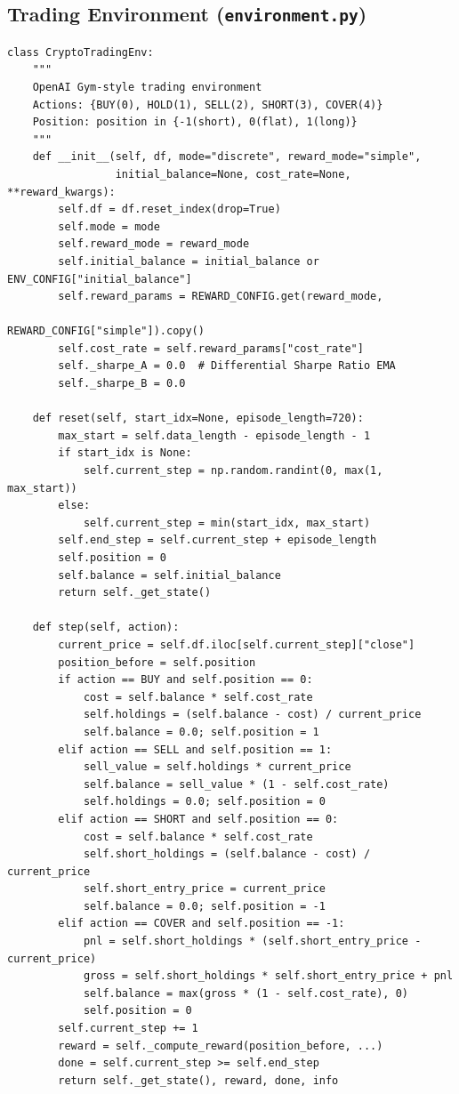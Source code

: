 \documentclass[11pt,a4paper]{article}
\begin{document}
\subsection{Trading Environment (\texttt{environment.py})}

\begin{lstlisting}
class CryptoTradingEnv:
    """
    OpenAI Gym-style trading environment
    Actions: {BUY(0), HOLD(1), SELL(2), SHORT(3), COVER(4)}
    Position: position in {-1(short), 0(flat), 1(long)}
    """
    def __init__(self, df, mode="discrete", reward_mode="simple",
                 initial_balance=None, cost_rate=None, **reward_kwargs):
        self.df = df.reset_index(drop=True)
        self.mode = mode
        self.reward_mode = reward_mode
        self.initial_balance = initial_balance or ENV_CONFIG["initial_balance"]
        self.reward_params = REWARD_CONFIG.get(reward_mode,
                                               REWARD_CONFIG["simple"]).copy()
        self.cost_rate = self.reward_params["cost_rate"]
        self._sharpe_A = 0.0  # Differential Sharpe Ratio EMA
        self._sharpe_B = 0.0

    def reset(self, start_idx=None, episode_length=720):
        max_start = self.data_length - episode_length - 1
        if start_idx is None:
            self.current_step = np.random.randint(0, max(1, max_start))
        else:
            self.current_step = min(start_idx, max_start)
        self.end_step = self.current_step + episode_length
        self.position = 0
        self.balance = self.initial_balance
        return self._get_state()

    def step(self, action):
        current_price = self.df.iloc[self.current_step]["close"]
        position_before = self.position
        if action == BUY and self.position == 0:
            cost = self.balance * self.cost_rate
            self.holdings = (self.balance - cost) / current_price
            self.balance = 0.0; self.position = 1
        elif action == SELL and self.position == 1:
            sell_value = self.holdings * current_price
            self.balance = sell_value * (1 - self.cost_rate)
            self.holdings = 0.0; self.position = 0
        elif action == SHORT and self.position == 0:
            cost = self.balance * self.cost_rate
            self.short_holdings = (self.balance - cost) / current_price
            self.short_entry_price = current_price
            self.balance = 0.0; self.position = -1
        elif action == COVER and self.position == -1:
            pnl = self.short_holdings * (self.short_entry_price - current_price)
            gross = self.short_holdings * self.short_entry_price + pnl
            self.balance = max(gross * (1 - self.cost_rate), 0)
            self.position = 0
        self.current_step += 1
        reward = self._compute_reward(position_before, ...)
        done = self.current_step >= self.end_step
        return self._get_state(), reward, done, info


\end{lstlisting}
\end{document}
